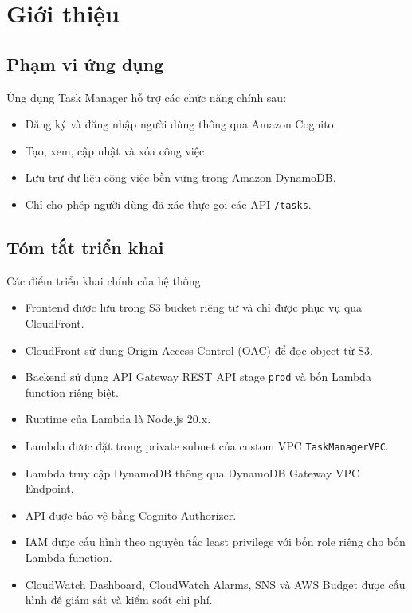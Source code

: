 \section{Giới thiệu}

\subsection{Phạm vi ứng dụng}

Ứng dụng Task Manager hỗ trợ các chức năng chính sau:

\begin{itemize}
    \item Đăng ký và đăng nhập người dùng thông qua Amazon Cognito.
    \item Tạo, xem, cập nhật và xóa công việc.
    \item Lưu trữ dữ liệu công việc bền vững trong Amazon DynamoDB.
    \item Chỉ cho phép người dùng đã xác thực gọi các API \texttt{/tasks}.
\end{itemize}

\subsection{Tóm tắt triển khai}

Các điểm triển khai chính của hệ thống:

\begin{itemize}
    \item Frontend được lưu trong S3 bucket riêng tư và chỉ được phục vụ qua CloudFront.
    \item CloudFront sử dụng Origin Access Control (OAC) để đọc object từ S3.
    \item Backend sử dụng API Gateway REST API stage \texttt{prod} và bốn Lambda function riêng biệt.
    \item Runtime của Lambda là Node.js 20.x.
    \item Lambda được đặt trong private subnet của custom VPC \texttt{TaskManagerVPC}.
    \item Lambda truy cập DynamoDB thông qua DynamoDB Gateway VPC Endpoint.
    \item API được bảo vệ bằng Cognito Authorizer.
    \item IAM được cấu hình theo nguyên tắc least privilege với bốn role riêng cho bốn Lambda function.
    \item CloudWatch Dashboard, CloudWatch Alarms, SNS và AWS Budget được cấu hình để giám sát và kiểm soát chi phí.
\end{itemize}

